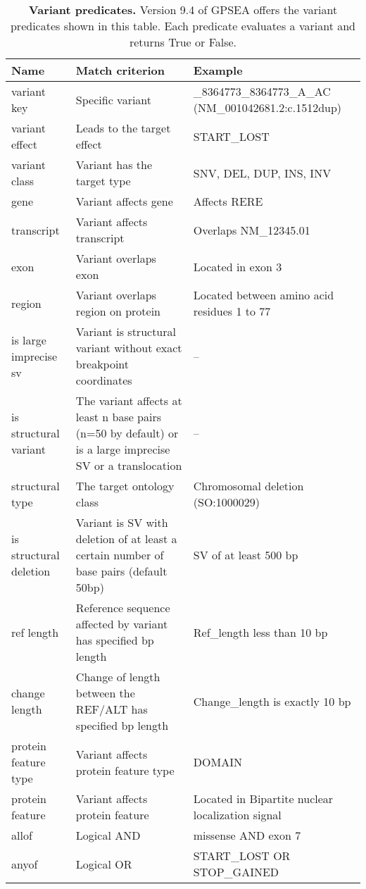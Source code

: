 
\begin{table}
\centering
\begin{scriptsize}
\renewcommand{\arraystretch}{1.2} %
\begin{tabular}{l>{\raggedright\arraybackslash}p{5cm}>{\raggedright\arraybackslash}p{5cm}}
\toprule
\textbf{Name} & \textbf{Match criterion} & \textbf{Example}\\
\midrule
variant key & Specific variant & 1\_8364773\_8364773\_A\_AC (NM\_001042681.2:c.1512dup) \\
variant effect & Leads to the target effect & START\_LOST \\
variant class & Variant has the target type & SNV, DEL, DUP, INS, INV \\
gene & Variant affects gene & Affects RERE \\
transcript & Variant affects transcript & Overlaps NM\_12345.01 \\
exon & Variant overlaps exon & Located in exon 3 \\
region & Variant overlaps region on protein & Located between amino acid residues 1 to 77 \\
is large imprecise sv & Variant is structural variant without exact breakpoint coordinates & -- \\
is structural variant & The variant affects at least n base pairs (n=50 by default) or is a large imprecise SV or a translocation & -- \\
structural type & The target ontology class & Chromosomal deletion (SO:1000029) \\
is structural deletion & Variant is SV with deletion of at least a certain number of base pairs (default 50bp) & SV of at least 500 bp \\
ref length & Reference sequence affected by variant has specified bp length & Ref\_length less than 10 bp \\
change length & Change of length between the REF/ALT has specified bp length & Change\_length is exactly 10 bp \\
protein feature type & Variant affects protein feature type & DOMAIN \\
protein feature & Variant affects protein feature & Located in Bipartite nuclear localization signal \\
allof & Logical AND & missense AND exon 7 \\
anyof & Logical OR & START\_LOST OR STOP\_GAINED \\
\bottomrule
\end{tabular}
\end{scriptsize}
\caption{\textbf{Variant predicates.} Version 9.4 of GPSEA offers the variant predicates shown in this table. Each predicate evaluates a variant and returns True or False.}
\label{tab:varpredicates}
\end{table}

